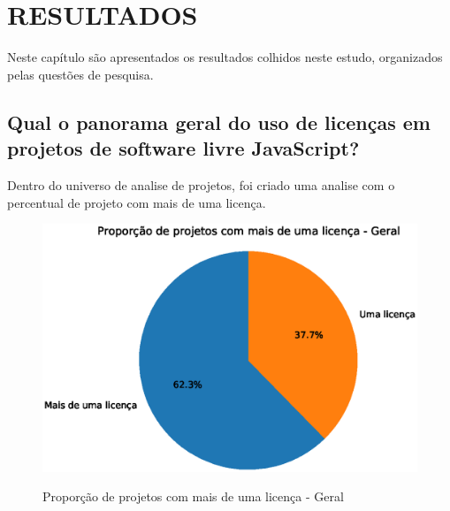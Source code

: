 
\chapter{RESULTADOS}
\label{chap:resultados}

Neste capítulo são apresentados os resultados colhidos neste estudo, organizados pelas questões de pesquisa.


\section{Qual o panorama geral do uso de licenças em projetos de software livre JavaScript?}

Dentro do universo de analise de projetos, foi criado uma analise com o percentual de projeto com mais de uma licença. 

\begin{figure}[H]
    \centering
    \caption{Proporção de projetos com mais de uma licença - Geral}
    \includegraphics[scale=0.8]{figuras/resultados/pizza_lic_geral.eps}
    \label{local-licencas-raiz}
\end{figure}

